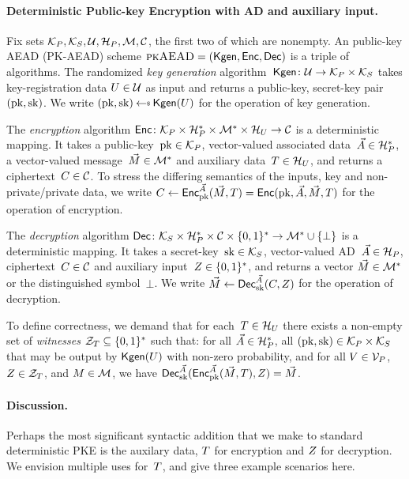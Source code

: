 \paragraph{Deterministic Public-key Encryption with AD and auxiliary input. }
Fix sets $\mathcal{K}_P, \mathcal{K}_S, \mathcal{U}, \mathcal{H}_P, \mathcal{M},\mathcal{C}$, the first two of which are nonempty.  An public-key AEAD
(PK-AEAD) scheme $\textsc{pkAEAD}=(\mathsf{Kgen},{\mathsf{Enc}},{\mathsf{Dec}})$ is a triple of algorithms.  The randomized \emph{key generation} algorithm~$\mathsf{Kgen}\colon\mathcal{U}\to\mathcal{K}_P\times\mathcal{K}_S$ takes key-registration data $U \in \mathcal{U}$ as input and returns a public-key, secret-key pair $(\mathrm{pk},\mathrm{sk})$.  We write $(\pk,\sk)\getsr\Kgen(\kreg)$ for the operation of key generation. 

The \emph{encryption} algorithm ${\mathsf{Enc}} \colon \mathcal{K}_P \times \mathcal{H}_P^* \times \mathcal{M}^* \times \mathcal{H}_U \to \mathcal{C}$ is a deterministic mapping.  It takes a public-key~$\mathrm{pk}\in\mathcal{K}_P$, vector-valued associated data~$\vec{A} \in \mathcal{H}_P^*$,  a vector-valued message~$\vec{M} \in \mathcal{M}^*$ and auxiliary data~$T \in \mathcal{H}_U$, and returns a ciphertext~$C \in \mathcal{C}$. 
To stress the differing semantics of the inputs, key and non-private/private data, we write $C\gets{\mathsf{Enc}}_{\mathrm{pk}}^{\vec{A}}(\vec{M},T) ={\mathsf{Enc}}(\mathrm{pk},\vec{A}, \vec{M},T)$ for the operation of encryption. 


The \emph{decryption} algorithm ${\mathsf{Dec}} \colon \mathcal{K}_S \times \mathcal{H}_P^* \times \mathcal{C} \times \{0,1\}^* \to \mathcal{M}^* \cup \{\bot\}$ is a deterministic mapping.  It takes a secret-key~$\mathrm{sk}\in\mathcal{K}_S$, vector-valued AD~$\vec{A} \in \mathcal{H}_P$, ciphertext~$C \in \mathcal{C}$ and auxiliary input~$Z\in\{0,1\}^*$, and returns a vector $\vec{M} \in \mathcal{M}^*$ or the distinguished symbol~$\bot$.  We write $\vec{M} \gets {\mathsf{Dec}}_{\mathrm{sk}}^{\vec{A}}(C,Z)$ for the operation of decryption.   

To define correctness, we demand that for each~$T\in\mathcal{H}_U$ there exists a non-empty set of \emph{witnesses} $\mathcal{Z}_T \subseteq \{0,1\}^*$ such that:  for all $\vec{A}\in\mathcal{H}_P^*$, all $(\mathrm{pk},\mathrm{sk})\in\mathcal{K}_P\times\mathcal{K}_S$ that may be output by $\mathsf{Kgen}(U)$ with non-zero probability, and for all $V\in\mathcal{V}_P$, $Z\in\mathcal{Z}_T$,  and $M\in\mathcal{M}$, we have ${\mathsf{Dec}}_{\mathrm{sk}}^{\vec{A}}({\mathsf{Enc}}_{\mathrm{pk}}^{\vec{A}}(\vec{M},T),Z)=\vec{M}$. 

\paragraph{Discussion. } Perhaps the most significant syntactic addition that we make to standard deterministic PKE is the auxilary data, $T$ for encryption and $Z$ for decryption.  We envision multiple uses for~$T$, and give three example scenarios here.


